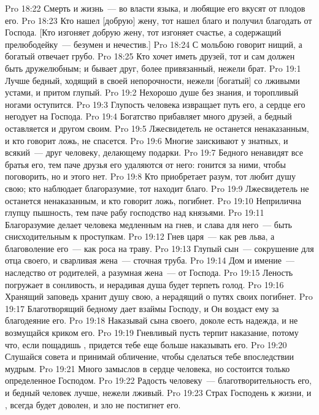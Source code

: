 \vs Pro 18:22 Смерть и жизнь~--- во власти языка, и любящие его вкусят от плодов его.
\vs Pro 18:23 Кто нашел [добрую] жену, тот нашел благо и получил благодать от Господа. [Кто изгоняет добрую жену, тот изгоняет счастье, а содержащий прелюбодейку~--- безумен и нечестив.]
\vs Pro 18:24 С мольбою говорит нищий, а богатый отвечает грубо.
\vs Pro 18:25 Кто хочет иметь друзей, тот и сам должен быть дружелюбным; и бывает друг, более привязанный, нежели брат.
\vs Pro 19:1 Лучше бедный, ходящий в своей непорочности, нежели [богатый] со лживыми устами, и притом глупый.
\vs Pro 19:2 Нехорошо душе без знания, и торопливый ногами оступится.
\vs Pro 19:3 Глупость человека извращает путь его, а сердце его негодует на Господа.
\vs Pro 19:4 Богатство прибавляет много друзей, а бедный оставляется и другом своим.
\vs Pro 19:5 Лжесвидетель не останется ненаказанным, и кто говорит ложь, не спасется.
\vs Pro 19:6 Многие заискивают у знатных, и всякий~--- друг человеку, делающему подарки.
\vs Pro 19:7 Бедного ненавидят все братья его, тем паче друзья его удаляются от него: гонится за ними, чтобы поговорить, но и этого нет.
\vs Pro 19:8 Кто приобретает разум, тот любит душу свою; кто наблюдает благоразумие, тот находит благо.
\vs Pro 19:9 Лжесвидетель не останется ненаказанным, и кто говорит ложь, погибнет.
\vs Pro 19:10 Неприлична глупцу пышность, тем паче рабу господство над князьями.
\vs Pro 19:11 Благоразумие делает человека медленным на гнев, и слава для него~--- быть снисходительным к проступкам.
\vs Pro 19:12 Гнев царя~--- как рев льва, а благоволение его~--- как роса на траву.
\vs Pro 19:13 Глупый сын~--- сокрушение для отца своего, и сварливая жена~--- сточная труба.
\vs Pro 19:14 Дом и имение~--- наследство от родителей, а разумная жена~--- от Господа.
\vs Pro 19:15 Леность погружает в сонливость, и нерадивая душа будет терпеть голод.
\vs Pro 19:16 Хранящий заповедь хранит душу свою, а нерадящий о путях своих погибнет.
\vs Pro 19:17 Благотворящий бедному дает взаймы Господу, и Он воздаст ему за благодеяние его.
\vs Pro 19:18 Наказывай сына своего, доколе есть надежда, и не возмущайся криком его.
\vs Pro 19:19 Гневливый пусть терпит наказание, потому что, если пощадишь , придется тебе еще больше наказывать его.
\vs Pro 19:20 Слушайся совета и принимай обличение, чтобы сделаться тебе впоследствии мудрым.
\vs Pro 19:21 Много замыслов в сердце человека, но состоится только определенное Господом.
\vs Pro 19:22 Радость человеку~--- благотворительность его, и бедный человек лучше, нежели лживый.
\vs Pro 19:23 Страх Господень  к жизни, и , всегда будет доволен, и зло не постигнет его.
